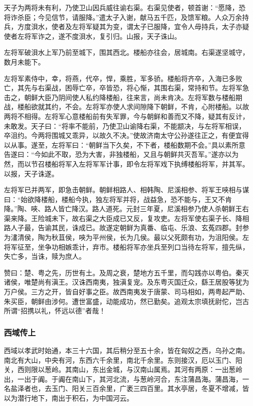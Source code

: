\documentclass[]{article}
\begin{document}
天子为两将未有利，乃使卫山因兵威往谕右渠。右渠见使者，顿首谢：``愿降，恐将诈杀臣；今见信节，请服降。''遣太子入谢，献马五千匹，及馈军粮。人众万余持兵，方度浿水，使者及左将军疑其为变，谓太子已服降，宜令人毋持兵，太子亦疑使者左将军诈之，遂不度浿水，复引归。山报，天子诛山。

左将军破浿水上军乃前至城下，围其西北。楼船亦往会，居城南。右渠遂坚城守，数月未能下。

左将军素侍中，幸，将燕，代卒，悍，乘胜，军多骄。楼船将齐卒，入海已多败亡，其先与右渠战，困辱亡卒，卒皆恐，将心惭，其围右渠，常持和节。左将军急击之，朝鲜大臣乃阴间使人私约降楼船，往来言，尚未肯决。左将军数与楼船期战，楼船欲就其约，不会。左将军亦使人求间隙降下朝鲜，不肯，心附楼船。以故两将不相得。左将军心意楼船前有失军罪，今与朝鲜和善而又不降，疑其有反计，未敢发。天子曰：``将率不能前，乃使卫山谕降右渠，不能颛决，与左将军相误，卒沮约。今两将围城又乖异，以故久不决。''使故济南太守公孙遂往正之，有便宜得以从事。遂至，左将军曰：``朝鲜当下久矣，不下者，楼船数期不会。''具以素所意告遂曰：``今如此不取，恐为大害，非独楼船，又且与朝鲜共灭吾军。''遂亦以为然，而以节召楼船将军入左将军军计事，即令左将军戏下执缚楼船将军，并其军。以报，天子诛遂。

左将军已并两军，即急击朝鲜。朝鲜相路人、相韩陶、尼溪相参、将军王唊相与谋曰：``始欲降楼船，楼船今执，独左将军并将，战益急，恐不能与，王又不肯降。''陶、唊、路人皆亡降汉。路人道死。元封三年夏，尼溪相参乃使人杀朝鲜王右渠来降。王险城未下，故右渠之大臣成已又反，复攻吏。左将军使右渠子长、降相路人子最，告谕其民，诛成已。故遂定朝鲜为真番、临屯、乐浪、玄菟四郡。封参为澅清侯，陶为秋苴侯，唊为平州侯，长为几侯。最以父死颇有功，为沮阳侯。左将军征至，坐争功相嫉乖计，弃市。楼船将军亦坐兵至列口当待左将军，擅先纵，失亡多，当诛，赎为庶人。

赞曰：楚、粤之先，历世有土。及周之衰，楚地方五千里，而勾践亦以粤伯。秦灭诸侯，唯楚尚有滇王。汉诛西南夷，独滇复宠。及东粤灭国迁众，繇王居股等犹为万户侯。三方之开，皆自好事之臣。故西南夷发于唐蒙、司马相如，两粤起严助、朱买臣，朝鲜由涉何。遭世富盛，动能成功，然已勤矣。追观太宗填抚尉佗，岂古所谓``招携以礼，怀远以德''者哉！

\hypertarget{header-n6360}{%
\subsubsection{西域传上}\label{header-n6360}}

西域以孝武时始通，本三十六国，其后稍分至五十余，皆在匈奴之西，乌孙之南。南北有大山，中央有河，东西六千余里，南北千余里。东则接汉，厄以玉门、阳关，西则限以葱岭。其南山，东出金城，与汉南山属焉。其河有两原：一出葱岭出，一出于阗。于阗在南山下，其河北流，与葱岭河合，东注蒲昌海。蒲昌海，一名盐泽者也，去玉门、阳关三百余里，广袤三四百里。其水亭居，冬夏不增减，皆以为潜行地下，南出于积石，为中国河云。
\end{document}
